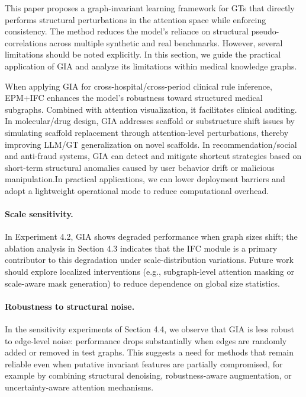 \documentclass[a4paper,fleqn]{cas-dc}
\begin{document}
{\color{blue}
This paper proposes a graph-invariant learning framework for GTs that directly performs structural perturbations in the attention space while enforcing consistency. The method reduces the model's reliance on structural pseudo-correlations across multiple synthetic and real benchmarks. However, several limitations should be noted explicitly. In this section, we guide the practical application of GIA and analyze its limitations within medical knowledge graphs.

When applying GIA for cross-hospital/cross-period clinical rule inference, EPM+IFC enhances the model's robustness toward structured medical subgraphs. Combined with attention visualization, it facilitates clinical auditing. In molecular/drug design, GIA addresses scaffold or substructure shift issues by simulating scaffold replacement through attention-level perturbations, thereby improving LLM/GT generalization on novel scaffolds. In recommendation/social and anti-fraud systems, GIA can detect and mitigate shortcut strategies based on short-term structural anomalies caused by user behavior drift or malicious manipulation.In practical applications, we can lower deployment barriers and adopt a lightweight operational mode to reduce computational overhead.

\paragraph{Scale sensitivity.} In Experiment 4.2, GIA shows degraded performance when graph sizes shift; the ablation analysis in Section 4.3 indicates that the IFC module is a primary contributor to this degradation under scale-distribution variations. Future work should explore localized interventions (e.g., subgraph-level attention masking or scale-aware mask generation) to reduce dependence on global size statistics.

\paragraph{Robustness to structural noise.} In the sensitivity experiments of Section 4.4, we observe that GIA is less robust to edge-level noise: performance drops substantially when edges are randomly added or removed in test graphs. This suggests a need for methods that remain reliable even when putative invariant features are partially compromised, for example by combining structural denoising, robustness-aware augmentation, or uncertainty-aware attention mechanisms.

}
\end{document}
